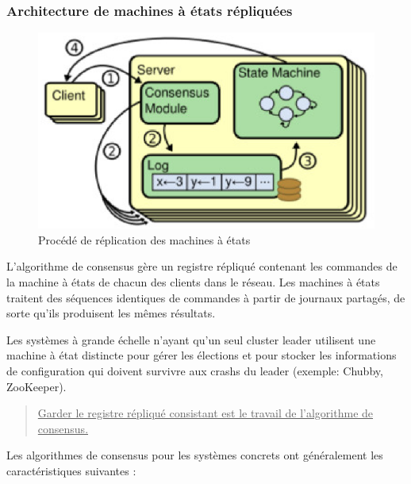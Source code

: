 \subsubsection{Architecture de machines à états répliquées}

\begin{figure}
    \centerline{\includegraphics[width=.47\textwidth]{img/replicated_state_machine}}
    \caption{Procédé de réplication des machines à états}
    \label{replicated_state_machine}
\end{figure}

L'algorithme de consensus gère un registre répliqué contenant les commandes de
la machine à états de chacun des clients dans le réseau. Les machines à états
traitent des séquences identiques de commandes à partir de journaux partagés, de
sorte qu'ils produisent les mêmes résultats.

Les systèmes à grande échelle n'ayant qu'un seul cluster leader utilisent une
machine à état distincte pour gérer les élections et pour stocker les
informations de configuration qui doivent survivre aux crashs du leader
(exemple: Chubby, ZooKeeper).

\begin{verse}
    \underline{
        Garder le registre répliqué consistant est le travail de l'algorithme de
        consensus.
    }
\end{verse}

Les algorithmes de consensus pour les systèmes concrets ont généralement les
caractéristiques suivantes :


